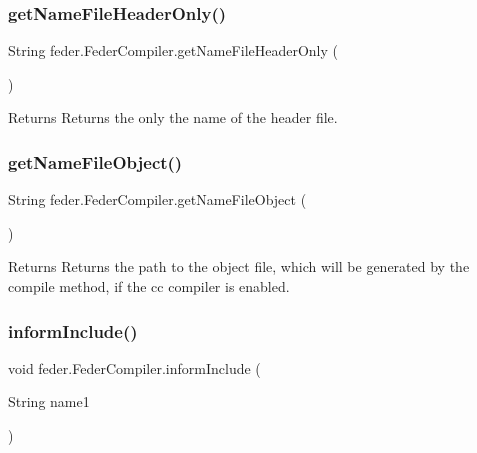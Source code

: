 \subsubsection{\texorpdfstring{get\+Name\+File\+Header\+Only()}{getNameFileHeaderOnly()}}
{\footnotesize\ttfamily String feder.\+Feder\+Compiler.\+get\+Name\+File\+Header\+Only (\begin{DoxyParamCaption}{ }\end{DoxyParamCaption})}

\begin{DoxyReturn}{Returns}
Returns the only the name of the header file. 
\end{DoxyReturn}
\mbox{\label{classfeder_1_1FederCompiler_a1c4f7b541e25baae015492afcbb96965}} 
\subsubsection{\texorpdfstring{get\+Name\+File\+Object()}{getNameFileObject()}}
{\footnotesize\ttfamily String feder.\+Feder\+Compiler.\+get\+Name\+File\+Object (\begin{DoxyParamCaption}{ }\end{DoxyParamCaption})}

\begin{DoxyReturn}{Returns}
Returns the path to the object file, which will be generated by the \textquotesingle{}compile\textquotesingle{} method, if the cc compiler is enabled. 
\end{DoxyReturn}
\mbox{\label{classfeder_1_1FederCompiler_a11c62c5eaf76b4a8e1b994981cb88ff3}} 
\subsubsection{\texorpdfstring{inform\+Include()}{informInclude()}}
{\footnotesize\ttfamily void feder.\+Feder\+Compiler.\+inform\+Include (\begin{DoxyParamCaption}\item[{String}]{name1 }\end{DoxyParamCaption})}

